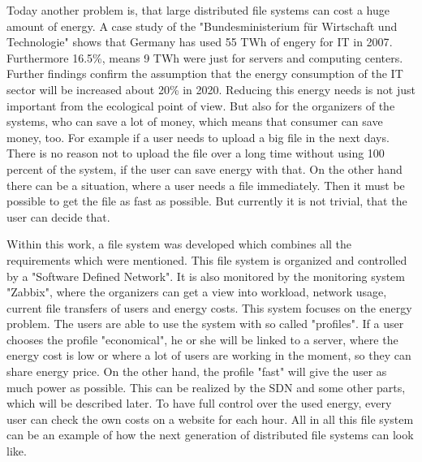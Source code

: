 Today another problem is, that large distributed file systems can cost a huge amount of energy. A case study of the "Bundesministerium f\"ur Wirtschaft und Technologie" shows that Germany has used 55 TWh of engery for IT in 2007\cite{bmwi}. Furthermore 16.5\%, means 9 TWh were just for servers and computing centers. Further findings confirm the assumption that the energy consumption of the IT sector will be increased about 20\% in 2020. Reducing this energy needs is not just important from the ecological point of view. But also for the organizers of the systems, who can save a lot of money, which means that consumer can save money, too. For example if a user needs to upload a big file in the next days. There is no reason not to upload the file over a long time without using 100 percent of the system, if the user can save energy with that. On the other hand there can be a situation, where a user needs a file immediately. Then it must be possible to get the file as fast as possible. But currently it is not trivial, that the user can decide that.  

Within this work, a file system was developed which combines all the requirements which were mentioned. This file system is organized and controlled by a "Software Defined Network". It is also monitored by the monitoring system "Zabbix", where the organizers can get a view into workload, network usage, current file transfers of users and energy costs. This system focuses on the energy problem. The users are able to use the system with so called "profiles". If a user chooses the profile "economical", he or she will be linked to a server, where the energy cost is low or where a lot of users are working in the moment, so they can share energy price. On the other hand, the profile "fast" will give the user as much power as possible. This can be realized by the SDN and some other parts, which will be described later. To have full control over the used energy, every user can check the own costs on a website for each hour. All in all this file system can be an example of how the next generation of distributed file systems can look like.               